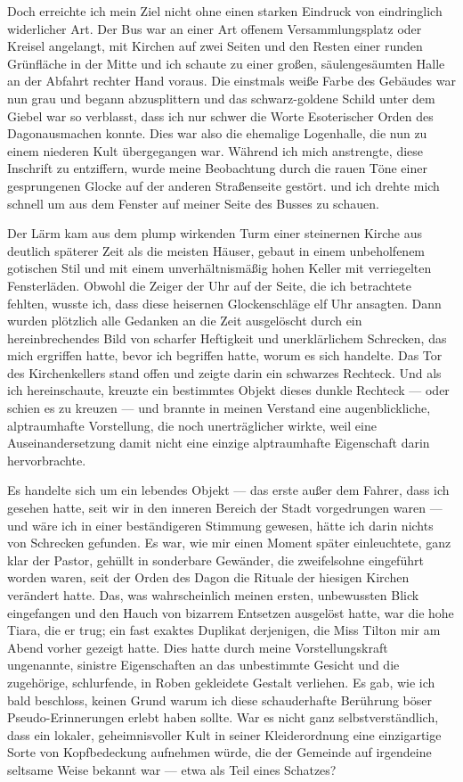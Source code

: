 Doch erreichte ich mein Ziel nicht ohne einen starken Eindruck von eindringlich widerlicher Art. Der Bus war an einer Art offenem Versammlungsplatz oder Kreisel angelangt, mit Kirchen auf zwei Seiten und den Resten einer runden Grünfläche in der Mitte und ich schaute zu einer großen, säulengesäumten Halle an der Abfahrt rechter Hand voraus. Die einstmals weiße Farbe des Gebäudes war nun grau und begann abzusplittern und das schwarz-goldene Schild unter dem Giebel war so verblasst, dass ich nur schwer die Worte \glqq Esoterischer
Orden des Dagon\grqq ausmachen konnte. Dies war also die ehemalige Logenhalle, die nun zu einem niederen Kult übergegangen war. Während ich mich anstrengte, diese Inschrift zu entziffern, wurde meine Beobachtung durch die rauen Töne einer gesprungenen Glocke auf der anderen Straßenseite gestört. und ich drehte mich schnell um aus dem Fenster auf meiner Seite des Busses zu  schauen.

Der Lärm kam aus dem plump wirkenden Turm einer steinernen Kirche aus deutlich späterer Zeit als die meisten Häuser, gebaut in einem unbeholfenem gotischen Stil und mit einem unverhältnismäßig hohen Keller mit verriegelten Fensterläden. Obwohl die Zeiger der Uhr auf der Seite, die ich betrachtete fehlten, wusste ich, dass diese heisernen Glockenschläge elf Uhr ansagten. Dann wurden plötzlich alle Gedanken an die Zeit ausgelöscht durch ein hereinbrechendes Bild von scharfer Heftigkeit  und unerklärlichem Schrecken, das mich ergriffen hatte, bevor ich begriffen hatte, worum es sich handelte. Das Tor des Kirchenkellers stand offen und zeigte darin ein schwarzes Rechteck. Und als ich hereinschaute, kreuzte ein bestimmtes Objekt dieses dunkle Rechteck --- oder schien es zu kreuzen --- und brannte in meinen Verstand eine augenblickliche, alptraumhafte Vorstellung, die noch unerträglicher wirkte, weil eine Auseinandersetzung damit nicht eine einzige alptraumhafte Eigenschaft darin hervorbrachte.

Es handelte sich um ein lebendes Objekt --- das erste außer dem Fahrer, dass ich gesehen hatte, seit wir in den inneren Bereich der Stadt vorgedrungen waren --- und wäre ich in einer beständigeren Stimmung gewesen, hätte ich darin nichts von Schrecken gefunden. Es war, wie mir einen Moment später einleuchtete, ganz klar der Pastor, gehüllt in sonderbare Gewänder, die zweifelsohne eingeführt worden waren, seit der Orden des Dagon die Rituale der hiesigen Kirchen verändert hatte. Das, was wahrscheinlich meinen ersten, unbewussten Blick eingefangen und den Hauch von bizarrem Entsetzen ausgelöst hatte, war die hohe Tiara, die er trug; ein fast exaktes Duplikat derjenigen, die Miss Tilton mir am Abend vorher gezeigt hatte. Dies hatte durch meine Vorstellungskraft ungenannte, sinistre Eigenschaften an das unbestimmte Gesicht und die zugehörige, schlurfende, in Roben gekleidete Gestalt verliehen. Es gab, wie ich bald beschloss, keinen Grund warum ich diese schauderhafte Berührung böser Pseudo-Erinnerungen erlebt haben sollte. War es nicht ganz selbstverständlich, dass ein lokaler, geheimnisvoller Kult in seiner Kleiderordnung eine einzigartige Sorte von Kopfbedeckung aufnehmen würde, die der Gemeinde auf irgendeine seltsame Weise bekannt war --- etwa als 
Teil eines Schatzes?

